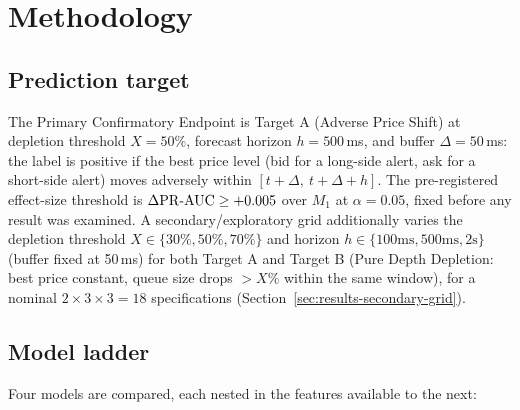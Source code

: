 \section{Methodology}
\label{sec:methodology}

\subsection{Prediction target}
\label{sec:methodology-target}

The Primary Confirmatory Endpoint is Target A (Adverse Price Shift) at
depletion threshold $X = 50\%$, forecast horizon $h = 500$\,ms, and
buffer $\Delta = 50$\,ms: the label is positive if the best price level
(bid for a long-side alert, ask for a short-side alert) moves adversely
within $[t+\Delta,\ t+\Delta+h]$. The pre-registered effect-size threshold
is $\Delta\mathrm{PR\text{-}AUC} \ge +0.005$ over $M_1$ at $\alpha = 0.05$, fixed before
any result was examined. A secondary/exploratory grid additionally varies
the depletion threshold $X \in \{30\%, 50\%, 70\%\}$ and horizon
$h \in \{100\text{ms}, 500\text{ms}, 2\text{s}\}$ (buffer fixed at 50\,ms)
for both Target A and Target B (Pure Depth Depletion: best price
constant, queue size drops $>X\%$ within the same window), for a nominal
$2 \times 3 \times 3 = 18$ specifications
(Section~\ref{sec:results-secondary-grid}).

\subsection{Model ladder}
\label{sec:methodology-ladder}

Four models are compared, each nested in the features available to the
next:

